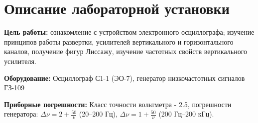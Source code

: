 
\newcommand{\labauthor}{Сарафанов Ф.\,Г.}
\newcommand{\labauthors}{Сарафанов Ф.\,Г.}
\newcommand{\labnumber}{17}
\newcommand{\labtheme}{Осциллограф}


\newcommand{\ddt}{$\ \pm\ 0.2\ \text{с}$}
\newcommand{\ddtv}{$\ \pm\ 0.8\ \text{с}$}
\newcommand{\ddh}{$\ \pm\ 0.1\ \text{см}$}
\newcommand{\dm}{\Delta{}m}
\newcommand{\Dh}{\Delta{}x}
\newcommand{\Dl}{\Delta{}(\lambda)}
\newcommand{\dmsr}{<\Delta{}m>}
\newcommand{\el}{\varepsilon(\lambda)}

\usetikzlibrary{%
    decorations.pathreplacing,%
    decorations.pathmorphing,%
    arrows,%
    patterns
}
\newcommand{\Scale}{1}
\newcommand{\lft}{9}
\newcommand{\rft}{10.43*1.5}
\newcommand{\Xstep}{1.5}
\newcommand{\Ystep}{1.5*20}
\newcommand{\Radius}{0.1}
\newcommand{\Color}{black}
\newcommand{\Tr}{T_\text{р}}
\newcommand{\Ts}{T_\text{с}}


\usepackage{float}





\tableofcontents

\newpage
\section{Описание лабораторной установки}

\textbf{Цель работы:} ознакомление с устройством электронного осциллографа; изучение принципов работы развертки, усилителей вертикального и горизонтального каналов, получение фигур Лиссажу, изучение частотных свойств вертикального усилителя.
\vspace{1.5em}

\textbf{Оборудование:}
Осциллограф С1-1 (ЭО-7), генератор низкочастотных сигналов ГЗ-109
\vspace{1.5em}

\textbf{Приборные погрешности:} Класс точности вольтметра - 2.5, погрешности генератора: $\Delta{\nu}=2+\frac{50}{\nu}$ (20--200 Гц), $\Delta{\nu}=1+\frac{50}{\nu}$ (200 Гц--200 кГц).
\vspace{1.5em}

